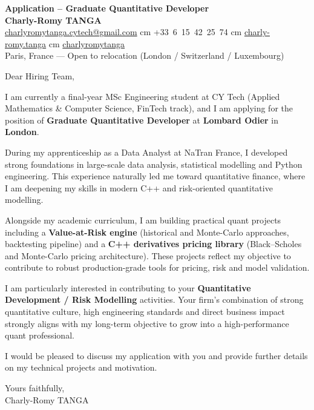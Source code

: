 \documentclass[10pt, letterpaper]{article}
\newcommand{\targetcompany}{Lombard Odier}
\newcommand{\targetrole}{Graduate Quantitative Developer}
\newcommand{\targetlocation}{London}
\newcommand{\targetteam}{Quantitative Development / Risk Modelling}
\newcommand{\targetmotivation}{Your firm's combination of strong quantitative culture, high engineering standards and direct business impact strongly aligns with my long-term objective to grow into a high-performance quant professional.}
\begin{document}
\begin{center}
    \textbf{\LARGE Application -- \targetrole{}} \\[0.2cm]
    \textbf{\large Charly-Romy TANGA} \\[0.2cm]

    \mbox{\href{mailto:charlyromytanga.cytech@gmail.com}{\footnotesize\faEnvelope\hspace*{0.1cm}charlyromytanga.cytech@gmail.com}}
     cm
    \mbox{\faPhone\hspace*{0.1cm}+33 6 15 42 25 74}
     cm
    \mbox{\href{https://www.linkedin.com/in/charly-romy-tanga}{\footnotesize\faLinkedin\hspace*{0.1cm}charly-romy.tanga}}
     cm
    \mbox{\href{https://github.com/charlyromytanga}{\footnotesize\faGithub\hspace*{0.1cm}charlyromytanga}}
    \\[0.2cm]
    Paris, France --- Open to relocation (London / Switzerland / Luxembourg)
\end{center}

\vspace{0.4cm}

Dear Hiring Team,

I am currently a final-year MSc Engineering student at CY Tech (Applied Mathematics \& Computer Science, FinTech track), and I am applying for the position of \textbf{\targetrole{}} at \textbf{\targetcompany{}} in \textbf{\targetlocation{}}.

During my apprenticeship as a Data Analyst at NaTran France, I developed strong foundations in large-scale data analysis, statistical modelling and Python engineering. This experience naturally led me toward quantitative finance, where I am deepening my skills in modern C++ and risk-oriented quantitative modelling.

Alongside my academic curriculum, I am building practical quant projects including a \textbf{Value-at-Risk engine} (historical and Monte-Carlo approaches, backtesting pipeline) and a \textbf{C++ derivatives pricing library} (Black--Scholes and Monte-Carlo pricing architecture). These projects reflect my objective to contribute to robust production-grade tools for pricing, risk and model validation.

I am particularly interested in contributing to your \textbf{\targetteam{}} activities. \targetmotivation{}

I would be pleased to discuss my application with you and provide further details on my technical projects and motivation.

\vspace{0.5cm}

Yours faithfully, \\
Charly-Romy TANGA
\end{document}

